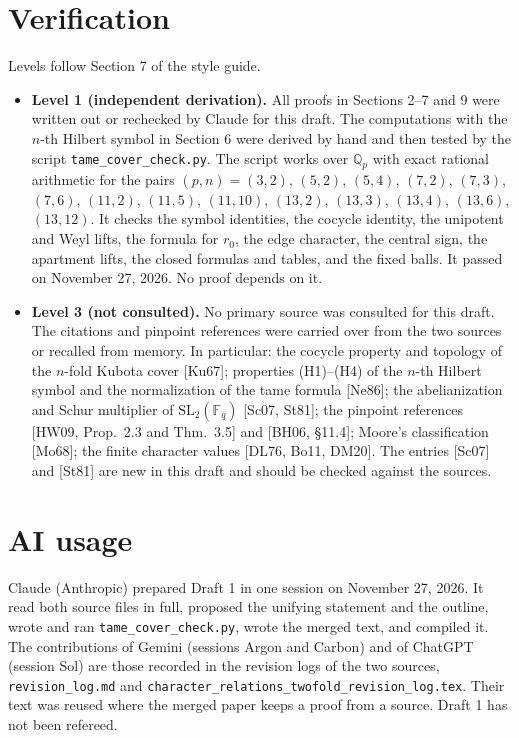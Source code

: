 \documentclass[12pt,letterpaper]{article}
\begin{document}
\section{Verification}
Levels follow Section 7 of the style guide.
\begin{itemize}[leftmargin=2em]
\item \textbf{Level 1 (independent derivation).} All proofs in Sections 2--7 and 9 were written out or rechecked by Claude for this draft. The computations with the $n$-th Hilbert symbol in Section 6 were derived by hand and then tested by the script \texttt{tame\_cover\_check.py}. The script works over $\mathbb Q_p$ with exact rational arithmetic for the pairs $(p,n)=(3,2)$, $(5,2)$, $(5,4)$, $(7,2)$, $(7,3)$, $(7,6)$, $(11,2)$, $(11,5)$, $(11,10)$, $(13,2)$, $(13,3)$, $(13,4)$, $(13,6)$, $(13,12)$. It checks the symbol identities, the cocycle identity, the unipotent and Weyl lifts, the formula for $r_0$, the edge character, the central sign, the apartment lifts, the closed formulas and tables, and the fixed balls. It passed on November 27, 2026. No proof depends on it.
\item \textbf{Level 3 (not consulted).} No primary source was consulted for this draft. The citations and pinpoint references were carried over from the two sources or recalled from memory. In particular: the cocycle property and topology of the $n$-fold Kubota cover [Ku67]; properties (H1)--(H4) of the $n$-th Hilbert symbol and the normalization of the tame formula [Ne86]; the abelianization and Schur multiplier of $\mathrm{SL}_2(\mathbb F_q)$ [Sc07, St81]; the pinpoint references [HW09, Prop.\ 2.3 and Thm.\ 3.5] and [BH06, \S11.4]; Moore's classification [Mo68]; the finite character values [DL76, Bo11, DM20]. The entries [Sc07] and [St81] are new in this draft and should be checked against the sources.
\end{itemize}

\section{AI usage}
Claude (Anthropic) prepared Draft 1 in one session on November 27, 2026. It read both source files in full, proposed the unifying statement and the outline, wrote and ran \texttt{tame\_cover\_check.py}, wrote the merged text, and compiled it. The contributions of Gemini (sessions Argon and Carbon) and of ChatGPT (session Sol) are those recorded in the revision logs of the two sources, \texttt{revision\_log.md} and \texttt{character\_relations\_twofold\_revision\_log.tex}. Their text was reused where the merged paper keeps a proof from a source. Draft 1 has not been refereed.
\end{document}
